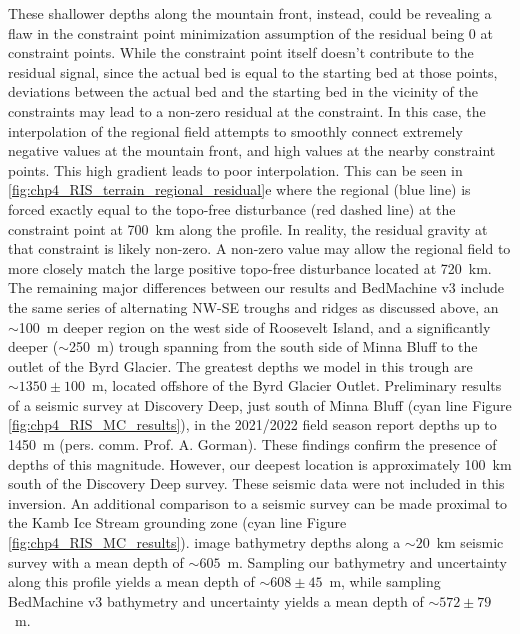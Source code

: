 These shallower depths along the mountain front, instead, could be revealing a flaw in the constraint point minimization assumption of the residual being 0 at constraint points. While the constraint point itself doesn't contribute to the residual signal, since the actual bed is equal to the starting bed at those points, deviations between the actual bed and the starting bed in the vicinity of the constraints may lead to a non-zero residual at the constraint. In this case, the interpolation of the regional field attempts to smoothly connect extremely negative values at the mountain front, and high values at the nearby constraint points. This high gradient leads to poor interpolation. This can be seen in \ref{fig:chp4_RIS_terrain_regional_residual}e where the regional (blue line) is forced exactly equal to the topo-free disturbance (red dashed line) at the constraint point at 700~km along the profile. In reality, the residual gravity at that constraint is likely non-zero. A non-zero value may allow the regional field to more closely match the large positive topo-free disturbance located at 720~km.\\

The remaining major differences between our results and BedMachine v3 include the same series of alternating NW-SE troughs and ridges as discussed above, an $\sim$100~m deeper region on the west side of Roosevelt Island, and a significantly deeper ($\sim$250~m) trough spanning from the south side of Minna Bluff to the outlet of the Byrd Glacier. The greatest depths we model in this trough are $\sim1350\pm100$~m, located offshore of the Byrd Glacier Outlet. Preliminary results of a seismic survey at Discovery Deep, just south of Minna Bluff (cyan line Figure \ref{fig:chp4_RIS_MC_results}), in the 2021/2022 field season report depths up to 1450~m (pers. comm. Prof. A. Gorman). These findings confirm the presence of depths of this magnitude. However, our deepest location is approximately 100~km south of the Discovery Deep survey. These seismic data were not included in this inversion. An additional comparison to a seismic survey can be made proximal to the Kamb Ice Stream grounding zone (cyan line Figure \ref{fig:chp4_RIS_MC_results}). \citet{horganpoststagnation2017} image bathymetry depths along a $\sim20$~km seismic survey with a mean depth of $\sim605$~m. Sampling our bathymetry and uncertainty along this profile yields a mean depth of $\sim608\pm45$~m, while sampling BedMachine v3 bathymetry and uncertainty yields a mean depth of $\sim572\pm79$~m.\\


